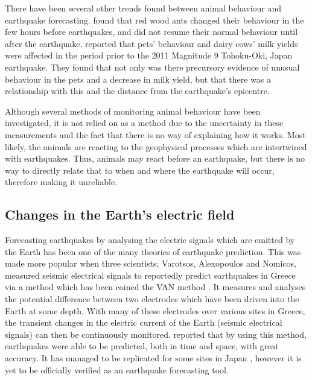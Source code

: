 \documentclass[12pt]{report}
\begin{document}
There have been several other trends found between animal behaviour and earthquake forecasting. \cite{Berberich2013} found that red wood ants changed their behaviour in the few hours before earthquakes, and did not resume their normal behaviour until after the earthquake. \cite{Yamauchi2014} reported that pets' behaviour and dairy cows' milk yields were affected in the period prior to the 2011 Magnitude 9 Tohoku-Oki, Japan earthquake. They found that not only was there precursory evidence of unusual behaviour in the pets and a decrease in milk yield, but that there was a relationship with this and the distance from the earthquake's epicentre. 

Although several methods of monitoring animal behaviour have been investigated, it is not relied on as a method due to the uncertainty in these measurements and the fact that there is no way of explaining how it works. Most likely, the animals are reacting to the geophysical processes which are intertwined with earthquakes. %
Thus, animals may react before an earthquake, but there is no way to directly relate that to when and where the earthquake will occur, therefore making it unreliable. 

\subsection{Changes in the Earth's electric field}
Forecasting earthquakes by analysing the electric signals which are emitted by the Earth has been one of the many theories of earthquake prediction. This was made more popular when three scientists; Varotsos, Alexopoulos and Nomicos, measured seismic electrical signals to reportedly predict earthquakes in Greece via a method which has been coined the VAN method \citep{Varotsos1988}. It measures and analyses the potential difference between two electrodes which have been driven into the Earth at some depth. With many of these electrodes over various sites in Greece, the transient changes in the electric current of the Earth (seismic electrical signals) can then be continuously monitored. \cite{Varotsos1988, Varotsos1993} reported that by using this method, earthquakes were able to be predicted, both in time and space, with great accuracy. It has managed to be replicated for some sites in Japan \citep{Uyeda2009}, however it is yet to be officially verified as an earthquake forecasting tool.
\end{document}
